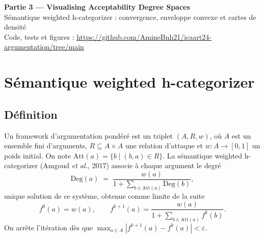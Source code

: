 \documentclass[10pt,a4paper]{article}
\theoremstyle{remark}
\newcommand{\Deg}{\mathrm{Deg}}
\newcommand{\Att}{\mathrm{Att}}
\newcommand{\HCat}{\mathrm{HCat}}
\begin{document}
\begin{center}
{\Large\textbf{Partie 3 --- Visualising Acceptability Degree Spaces}}\\[2pt]
Sémantique weighted h-categorizer : convergence, enveloppe convexe et cartes de densité\\[2pt]
\small Code, tests et figures : \url{https://github.com/AmineBnh21/icaart24-argumentation/tree/main}
\end{center}
\vspace{-4pt}
\begin{abstract}
Nous implémentons la sémantique \emph{weighted h-categorizer} avec un critère d'arrêt
paramétré par $\varepsilon>0$, puis nous étudions l'espace des degrés d'acceptabilité
$S=\HCat([0,1]^{|A|})$ en échantillonnant $100\,000$ vecteurs de poids uniformes pour
17 frameworks de 2 à 6 arguments. Nous montrons que $S$ admet une description exacte,
$\{x\ge 0 : x_a(1+\sum_{b\to a}x_b)\le 1\}$, et que la densité des points échantillonnés
vaut $|\det J_g(x)|$. Cela fournit une vérité terrain pour juger l'enveloppe convexe,
qui surestime $S$ de 7\,\% (2 arguments) à 22\,\% (6 arguments), et les cartes de densité.
Celles-ci sont robustes au ré-échantillonnage, avec une erreur qui décroît en $1/\sqrt N$
(environ 4\,\% en variation totale pour $N=100\,000$).
\end{abstract}

\section{Sémantique weighted h-categorizer}

\subsection{Définition}

Un framework d'argumentation pondéré est un triplet $(A,R,w)$, où $A$ est un ensemble fini
d'arguments, $R\subseteq A\times A$ une relation d'attaque et $w:A\to[0,1]$ un poids initial.
On note $\Att(a)=\{b \mid (b,a)\in R\}$. La sémantique weighted h-categorizer
(Amgoud \emph{et al.}, 2017) associe à chaque argument le degré
\begin{equation}\label{eq:hcat}
  \Deg(a) \;=\; \frac{w(a)}{1+\sum_{b\in\Att(a)}\Deg(b)} ,
\end{equation}
unique solution de ce système, obtenue comme limite de la suite
\begin{equation}\label{eq:iter}
  f^0(a)=w(a), \qquad f^{k+1}(a) = \frac{w(a)}{1+\sum_{b\in\Att(a)} f^k(b)} .
\end{equation}
On arrête l'itération dès que $\max_{a\in A}|f^{k+1}(a)-f^k(a)|<\varepsilon$.
\end{document}
